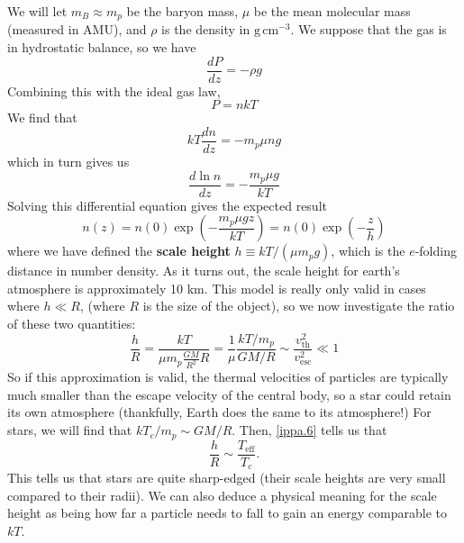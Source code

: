 \documentclass[10pt]{article}
\numberwithin{equation}{section}
\newcommand{\n}{\noindent}
\begin{document}
	 \n We will let $m_B\approx m_p$ be the baryon mass, $\mu$ be the mean 
molecular mass (measured in AMU), and $\rho$ is the density in $\mathrm{g
\,cm^{-3}}$. We suppose that the gas is in hydrostatic balance, so we have
	 \begin{equation}
	 	\label{ippa.1} \frac{dP}{dz}=-\rho g
	 \end{equation}
	 Combining this with the ideal gas law,
	 \begin{equation}
	 	\label{ippa.2} P=nkT
	 \end{equation}
	We find that
	\begin{equation}
		\label{ippa.3} kT\frac{dn}{dz}=-m_p\mu ng
	\end{equation}
	which in turn gives us
	\begin{equation}
		\label{ippa.4} \frac{d\ln n}{dz}=-\frac{m_p\mu g}{kT}
	\end{equation}
	Solving this differential equation gives the expected result
	\begin{equation}
		\label{ippa.5} n(z)=n(0)\exp\left(-\frac{m_p\mu gz}{kT}\right)=n
(0)\exp\left(-\frac{z}{h}\right)
	\end{equation}
	where we have defined the \textbf{scale height} $h\equiv kT/(\mu m_pg)
$, which is the $e$-folding distance in number density. As it turns out, the 
scale height for earth's atmosphere is approximately 10 km. This model is 
really only valid in cases where $h\ll R$, (where $R$ is the size of the 
object), so we now investigate the ratio of these two quantities:
	\begin{equation}
		\label{ippa.6} \frac{h}{R}=\frac{kT}{\mu m_p\frac{GM}{R^2}R}=\frac
{1}{\mu}\frac{kT/m_p}{GM/R}\sim \frac{v_{\mathrm{th}}^2}{v_{\mathrm{esc}}
^2}\ll 1
	\end{equation}
	So if this approximation is valid, the thermal velocities of particles 
are typically much smaller than the escape velocity of the central body, so 
a star could retain its own atmosphere (thankfully, Earth does the same to 
its atmosphere!) For stars, we will find that $kT_c/m_p\sim GM/R$. Then, 
\eqref{ippa.6} tells us that
	\begin{equation}
		\label{ippa.7} \frac{h}{R}\sim \frac{T_{\mathrm{eff}}}{T_c}.
	\end{equation}
	This tells us that stars are quite sharp-edged (their scale heights are 
very small compared to their radii). We can also deduce a physical meaning 
for the scale height as being how far a particle needs to fall to gain an 
energy comparable to $kT$.\\
	
\end{document}
